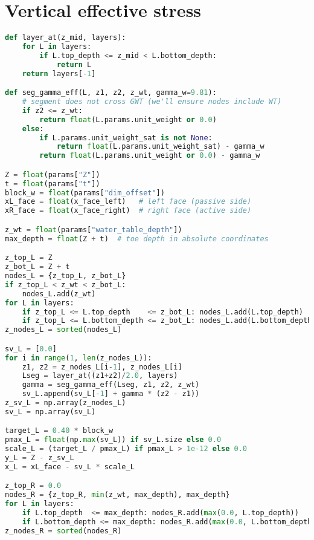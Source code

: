 

\section{Vertical effective stress}

\begin{lstlisting}[language=Python]
def layer_at(z_mid, layers):
    for L in layers:
        if L.top_depth <= z_mid < L.bottom_depth:
            return L
    return layers[-1]

def seg_gamma_eff(L, z1, z2, z_wt, gamma_w=9.81):
    # segment does not cross GWT (we'll ensure nodes include WT)
    if z2 <= z_wt:
        return float(L.params.unit_weight or 0.0)
    else:
        if L.params.unit_weight_sat is not None:
            return float(L.params.unit_weight_sat) - gamma_w
        return float(L.params.unit_weight or 0.0) - gamma_w

Z = float(params["Z"])
t = float(params["t"])
block_w = float(params["dim_offset"])
xL_face = float(x_face_left)   # left face (passive side)
xR_face = float(x_face_right)  # right face (active side)

z_wt = float(params["water_table_depth"])
max_depth = float(Z + t)  # toe depth in absolute coordinates

z_top_L = Z
z_bot_L = Z + t
nodes_L = {z_top_L, z_bot_L}
if z_top_L < z_wt < z_bot_L:
    nodes_L.add(z_wt)
for L in layers:
    if z_top_L <= L.top_depth    <= z_bot_L: nodes_L.add(L.top_depth)
    if z_top_L <= L.bottom_depth <= z_bot_L: nodes_L.add(L.bottom_depth)
z_nodes_L = sorted(nodes_L)

sv_L = [0.0]
for i in range(1, len(z_nodes_L)):
    z1, z2 = z_nodes_L[i-1], z_nodes_L[i]
    Lseg = layer_at((z1+z2)/2.0, layers)
    gamma = seg_gamma_eff(Lseg, z1, z2, z_wt)
    sv_L.append(sv_L[-1] + gamma * (z2 - z1))
z_sv_L = np.array(z_nodes_L)
sv_L = np.array(sv_L)

target_L = 0.40 * block_w
pmax_L = float(np.max(sv_L)) if sv_L.size else 0.0
scale_L = (target_L / pmax_L) if pmax_L > 1e-12 else 0.0
y_L = Z - z_sv_L
x_L = xL_face - sv_L * scale_L

z_top_R = 0.0
nodes_R = {z_top_R, min(z_wt, max_depth), max_depth}
for L in layers:
    if L.top_depth  <= max_depth: nodes_R.add(max(0.0, L.top_depth))
    if L.bottom_depth <= max_depth: nodes_R.add(max(0.0, L.bottom_depth))
z_nodes_R = sorted(nodes_R)


\end{lstlisting}
